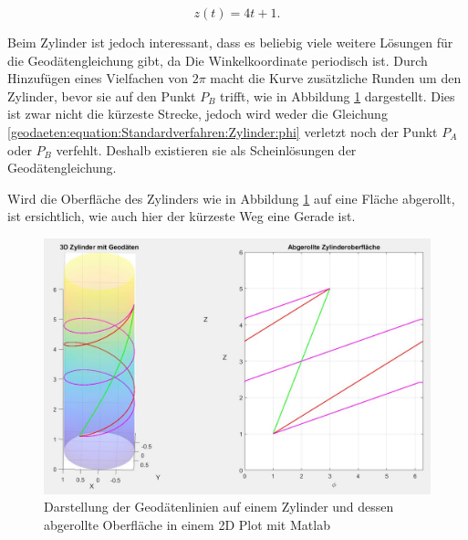 \begin{equation}
	z(t) = 4t + 1 .
\end{equation}

Beim Zylinder ist jedoch interessant, dass es beliebig viele weitere Lösungen für die Geodätengleichung gibt, da Die Winkelkoordinate periodisch ist.
Durch Hinzufügen eines Vielfachen von $2\pi$ macht die Kurve zusätzliche Runden um den Zylinder, bevor sie auf den Punkt $P_B$ trifft, wie in Abbildung \ref{geodaeten:figure:Linienelemente:Zylinder:figure1} dargestellt.
Dies ist zwar nicht die kürzeste Strecke, jedoch wird weder die Gleichung \eqref{geodaeten:equation:Standardverfahren:Zylinder:phi} verletzt noch der Punkt $P_A$ oder $P_B$ verfehlt.
Deshalb existieren sie als Scheinlösungen der Geodätengleichung.

Wird die Oberfläche des Zylinders wie in Abbildung \ref{geodaeten:figure:Linienelemente:Zylinder:figure1} auf eine Fläche abgerollt, ist ersichtlich, wie auch hier der kürzeste Weg eine Gerade ist.  

\begin{figure}
	\centering
	\includegraphics[width=14cm]{papers/geodaeten/Abbildungen/Standardverfahren/Zylinder}
	\caption{Darstellung der Geodätenlinien auf einem Zylinder und dessen abgerollte Oberfläche in einem 2D Plot mit Matlab}
	\label{geodaeten:figure:Linienelemente:Zylinder:figure1}
\end{figure}
